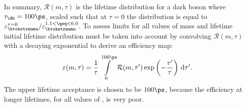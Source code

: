 In summary, $\mathcal{R}(m,\tau)$ is the lifetime distribution for a dark boson where
$\tau_\db=100\ps$,
scaled such that at $\tau=0$ the distribution is equal to
$\varepsilon_{\btokstrmumu}^{\tau=0} / \varepsilon_{\btokstrmumu}^{1.1<\qsq<6.0}$.
To assess limits for all values of mass and lifetime initial lifetime distribution must be taken
into account by convolving $\mathcal{R}(m,\tau)$ with a decaying exponential to derive an
efficiency map:
\begin{equation}
  \varepsilon(m,\tau) =
  \frac{1}{\tau}\int\limits_0^{100\ps}
  \mathcal{R}(m,\tau^{\prime})
  \exp\left(-\frac{\tau^{\prime}}{\tau}\right)
  \,{\rm d}\tau^{\prime}.
\end{equation}
The upper lifetime acceptance is chosen to be $100\ps$, because the efficiency at longer lifetimes,
for all values of \mass{\db}, is very poor.



